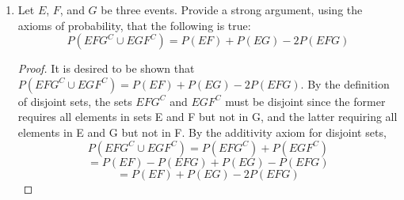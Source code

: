 \documentclass{article}
\begin{document}
\begin{enumerate}
\begin{enumerate}
            \item Describe the following events practically, in terms of the experiment:
                \begin{enumerate}
                    \item $E_1 \cup E_2$

                        Answer:
                        All events where either 1 is rolled first or second.

                    \item $E_1 \cap E_2$

                        Answer:
                        The null set, because they are disjoint since the experiment can not end at both the first and second rolls in the same trial of the experiment.

                    \item $\bigcup_{n=3}^{\infty} E_n$

                        Answer:
                        All events where 3 or more rolls occur in the experiment.

                    \item $\bigcup_{n=1}^{\infty} E_n$

                        Answer:
                        All events where an even number of rolls occur in the experiment.

                \end{enumerate}
        \end{enumerate}

    \clearpage

    \item Let $E$, $F$, and $G$ be three events. Provide a strong argument, using the axioms of probability, that the following is true:
        $$ P(EFG^C \cup EGF^C) = P(EF) + P(EG) - 2P(EFG) $$
    
        \begin{proof}
            It is desired to be shown that $P(EFG^C \cup EGF^C) = P(EF) + P(EG) - 2P(EFG)$. By the definition of disjoint sets, the sets $EFG^C$ and $EGF^C$ must be disjoint since the former requires all elements in sets E and F but not in G, and the latter requiring all elements in E and G but not in F. By the additivity axiom for disjoint sets, $$P(EFG^C \cup EGF^C) = P(EFG^C) + P(EGF^C) $$ $$ = P(EF) - P(EFG) + P(EG) - P(EFG) $$ $$ = P(EF) + P(EG) - 2P(EFG)$$
        \end{proof}

    \clearpage


\end{enumerate}
\end{document}
